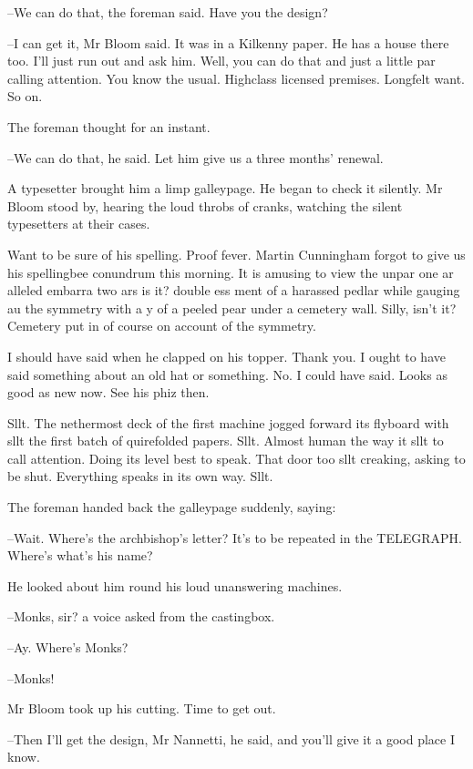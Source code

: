 --We can do that, the foreman said. Have you the design?

--I can get it, Mr Bloom said. It was in a Kilkenny paper. He has a house
there too. I'll just run out and ask him. Well, you can do that and just a
little par calling attention. You know the usual. Highclass licensed
premises. Longfelt want. So on.

The foreman thought for an instant.

--We can do that, he said. Let him give us a three months' renewal.

A typesetter brought him a limp galleypage. He began to check it
silently. Mr Bloom stood by, hearing the loud throbs of cranks, watching
the silent typesetters at their cases.



Want to be sure of his spelling. Proof fever. Martin Cunningham
forgot to give us his spellingbee conundrum this morning. It is amusing to
view the unpar one ar alleled embarra two ars is it? double ess ment of a
harassed pedlar while gauging au the symmetry with a y of a peeled pear
under a cemetery wall. Silly, isn't it? Cemetery put in of course on
account of the symmetry.

I should have said when he clapped on his topper. Thank you. I ought
to have said something about an old hat or something. No. I could have
said. Looks as good as new now. See his phiz then.

Sllt. The nethermost deck of the first machine jogged forward its
flyboard with sllt the first batch of quirefolded papers. Sllt. Almost
human the way it sllt to call attention. Doing its level best to speak.
That door too sllt creaking, asking to be shut. Everything speaks in its
own way. Sllt.



The foreman handed back the galleypage suddenly, saying:

--Wait. Where's the archbishop's letter? It's to be repeated in the
TELEGRAPH. Where's what's his name?

He looked about him round his loud unanswering machines.

--Monks, sir? a voice asked from the castingbox.

--Ay. Where's Monks?

--Monks!

Mr Bloom took up his cutting. Time to get out.

--Then I'll get the design, Mr Nannetti, he said, and you'll give it a
good place I know.

